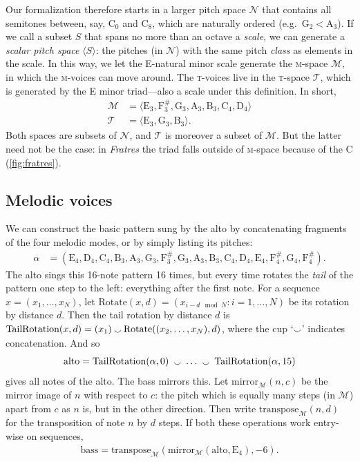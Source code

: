 \documentclass{interact}
\newcommand{\spn}[2]{\text{#1}_{#2}}
\newcommand\noteE{\spn E3}
\newcommand\noteF{\text{F}^\#_3}
\newcommand\noteG{\spn G3}
\newcommand\noteA{\spn A3}
\newcommand\noteB{\spn B3}
\newcommand\notec{\spn C4}
\newcommand\noted{\spn D4}
\newcommand\notee{\spn E4}
\newcommand\notef{\text{F}^\#_4}
\newcommand\noteg{\spn G4}
\newcommand{\MM}{\textsc{m}}
\newcommand{\TT}{\textsc{t}}
\newcommand*{\concat}{\mathbin{\raisebox{-.2em}{$\smallsmile$}}}
\begin{document}
Our formalization therefore starts in a larger pitch space $\mathcal N$ that contains all semitones between, say, $\spn{C}0$ and $\spn{C}8$, which are naturally ordered (e.g.~$\spn{G}{2} < \spn{A}{3}$).
If we call a subset $S$ that spans no more than an octave a \emph{scale}, we can generate a \emph{scalar pitch space} $\langle S \rangle$: the pitches (in $\mathcal N$) with the same pitch \emph{class} as elements in the scale.
In this way, we let the E-natural minor scale generate the \MM-space $\mathcal{M}$, in which the \MM-voices can move around.
The \TT-voices live in the \TT-space $\mathcal T$, which is generated by the E minor triad---also a scale under this definition.
In short,
%
\begin{align}
    \mathcal M &= \langle \noteE, \noteF, \noteG, \noteA, \noteB, \notec, \noted \rangle \\
    \mathcal T &= \langle \noteE, \noteG, \noteB \rangle.
\end{align}
%
Both spaces are subsets of $\mathcal N$, and $\mathcal T$ is moreover a subset of $\mathcal M$.
But the latter need not be the case: in \emph{Fratres} the triad falls outside of \MM-space because of the C\musNatural{} (\autoref{fig:fratres}).


\subsection{Melodic voices}

We can construct the basic pattern sung by the alto by concatenating fragments of the four melodic modes, or by simply listing its pitches:
%
\begin{align}
    \alpha 
        &= (\notee, \noted, \notec, \noteB, \noteA, 
        \noteG, \noteF, \noteG, 
        \noteA, \noteB, \notec, \noted, \notee, \notef,
        \noteg, \notef).
\end{align}
%
The alto sings this 16-note pattern 16 times, but every time rotates the \emph{tail} of the pattern one step to the left: everything after the first note.
For a sequence $x = (x_1, \dots, x_N)$, let $\text{Rotate}(x, d) = (x_{i - d \mod N}: i = 1, \dots, N)$ be its rotation by distance $d$. Then the tail rotation by distance $d$ is $\text{TailRotation}(x, d) = (x_1) \concat \text{Rotate}((x_2, \dots, x_N), d)$, where the cup `$\concat$' indicates concatenation. And so
%
\begin{align}
    \text{alto} = \text{TailRotation}(\alpha, 0) \; \concat \; \dots \; \concat \;  \text{TailRotation}(\alpha, 15)
\end{align}
%
gives all notes of the alto.
The bass mirrors this.
Let $\text{mirror}_\mathcal{M}(n, c)$ be the mirror image of $n$ with respect to $c$: the pitch which is equally many steps (in $\mathcal M$) apart from $c$ as $n$ is, but in the other direction.
Then write $\text{transpose}_\mathcal{M}(n, d)$ for the transposition of note $n$ by $d$ steps.
If both these operations work entry-wise on sequences,
%
\begin{align}
    \text{bass} = \text{transpose}_\mathcal{M}(\text{mirror}_\mathcal{M}(\text{alto}, \spn{E}{4}), -6).
\end{align}
\end{document}
